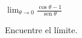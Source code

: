 \item $\displaystyle \lim_{\theta \to 0} \frac{\cos \theta - 1}{\operatorname{sen} \theta}$
\par
Encuentre el límite.
